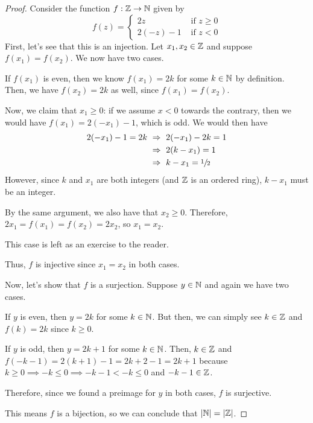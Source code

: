 \begin{proof}
    Consider the function $f: \mathbb{Z} \to \mathbb{N}$ given by
    \begin{equation*}
        f(z) =
        \begin{cases}
            2z        &\text{ if } z \geq 0\\
            2(-z) - 1 &\text{ if } z < 0
        \end{cases}
    \end{equation*}
    First, let's see that this is an injection.
    Let $x_1, x_2 \in \mathbb{Z}$ and suppose $f(x_1) = f(x_2)$.
    We now have two cases.

    \begin{case}[Case 1]
        If $f(x_1)$ is even, then we know $f(x_1) = 2k$ for some $k \in \mathbb{N}$ by definition.
        Then, we have $f(x_2) = 2k$ as well, since $f(x_1) = f(x_2)$.

        Now, we claim that $x_1 \geq 0$:
        if we assume $x < 0$ towards the contrary,
        then we would have $f(x_1) = 2(-x_1) - 1$, which is odd.
        We would then have
        \begin{align*}
            2(-x_1) - 1 = 2k &~\Rightarrow~ 2(-x_1) - 2k = 1\\
                             &~\Rightarrow~ 2(k - x_1) = 1\\
                             &~\Rightarrow~ k - x_1 = \sfrac{1}{2}
        \end{align*}
        However, since $k$ and $x_1$ are both integers (and $\mathbb{Z}$ is an ordered ring),
        $k - x_1$ must be an integer. \contradiction

        By the same argument, we also have that $x_2 \geq 0$.
        Therefore, $2x_1 = f(x_1) = f(x_2) = 2x_2$, so $x_1 = x_2$.
    \end{case}
    \begin{case}[Case 2]
        This case is left as an exercise to the reader.
    \end{case}
    Thus, $f$ is injective since $x_1 = x_2$ in both cases.

    Now, let's show that $f$ is a surjection.
    Suppose $y \in \mathbb{N}$ and again we have two cases.

    \begin{case}[Case 1]
        If $y$ is even, then $y = 2k$ for some $k \in \mathbb{N}$.
        But then, we can simply see $k \in \mathbb{Z}$ and $f(k) = 2k$ since $k \geq 0$.
    \end{case}
    \begin{case}[Case 2]
        If $y$ is odd, then $y = 2k + 1$ for some $k \in \mathbb{N}$.
        Then, $k \in \mathbb{Z}$ and $f(-k - 1) = 2(k + 1) - 1 = 2k + 2 - 1 = 2k + 1$
        because $k \geq 0 \implies -k \leq 0 \implies -k - 1 < -k \leq 0$ and $-k - 1 \in \mathbb{Z}$.
    \end{case}
    Therefore, since we found a preimage for $y$ in both cases, $f$ is surjective.

    This means $f$ is a bijection, so we can conclude that $\cardinality*{\N} = \cardinality*{\Z}$.
\end{proof}

